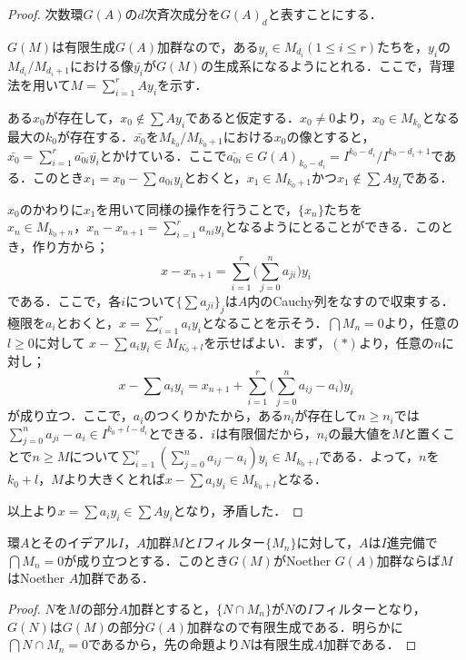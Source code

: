 \begin{proof}
	次数環$G(A)$の$d$次斉次成分を$G(A)_d$と表すことにする．
	
	$G(M)$は有限生成$G(A)$加群なので，ある$y_i\in M_{d_i} (1\leq i\leq r)$たちを，$y_i$の$M_{d_i}/M_{d_i+1}$における像$\bar{y_i}$が$G(M)$の生成系になるようにとれる．ここで，背理法を用いて$M=\sum_{i=1}^r Ay_i$を示す．
	
	ある$x_0$が存在して，$x_0\not\in\sum Ay_i$であると仮定する．$x_0\neq0$より，$x_0\in M_{k_0}$となる最大の$k_0$が存在する．$\bar{x_0}$を$M_{k_0}/M_{k_0+1}$における$x_0$の像とすると，$\bar{x_0}=\sum_{i=1}^r\bar{a_{0i}}\bar{y_i}$とかけている．ここで$\bar{a_{0i}}\in G(A)_{k_0-d_i}=I^{k_0-d_i}/I^{k_0-d_i+1}$である．このとき$x_1=x_0-\sum a_{0i}y_i$とおくと，$x_1\in M_{k_0+1}$かつ$x_1\not\in\sum Ay_i$である．
	
	$x_0$のかわりに$x_1$を用いて同様の操作を行うことで，$\{x_n\}$たちを$x_n\in M_{k_0+n}，x_n-x_{n+1}=\sum_{i=1}^r a_{ni}y_i$となるようにとることができる．このとき，作り方から；
	\[x-x_{n+1}=\sum_{i=1}^r\biggl(\sum_{j=0}^n a_{ji}\biggr) y_i\tag{$\ast$}\]
	である．ここで，各$i$について$\{\sum a_{ji}\}_j$は$A$内のCauchy列をなすので収束する．極限を$a_i$とおくと，$x=\sum_{i=1}^r a_iy_i$となることを示そう．$\bigcap M_n=0$より，任意の$l\geq0$に対して $x-\sum a_iy_i\in M_{K_0+l}$を示せばよい．まず，$(\ast)$より，任意の$n$に対し；
	\[x-\sum a_iy_i=x_{n+1}+\sum_{i=1}^r\biggl(\sum_{j=0}^{n} a_{ij}-a_i\biggr)y_i\]
	が成り立つ．ここで，$a_i$のつくりかたから，ある$n_i$が存在して$n\geq n_i$では$\sum_{j=0}^n a_{ji}-a_i\in I^{k_0+l-d_i}$とできる．$i$は有限個だから，$n_i$の最大値を$M$と置くことで$n\geq M$について$\sum_{i=1}^r(\sum_{j=0}^n a_{ij}-a_i)y_i\in M_{k_0+l}$である．よって，$n$を$k_0+l，M$より大きくとれば$x-\sum a_iy_i\in M_{k_0+l}$となる．
	
	以上より$x=\sum a_iy_i\in\sum Ay_i$となり，矛盾した．
\end{proof}

\begin{cor}\label{cor:G(M)がNoetherならMもNoether}
	環$A$とそのイデアル$I$，$A$加群$M$と$I$フィルター$\{M_n\}$に対して，$A$は$I$進完備で$\bigcap M_n=0$が成り立つとする．このとき$G(M)$がNoether $G(A)$加群ならば$M$はNoether $A$加群である．
\end{cor}

\begin{proof}
	$N$を$M$の部分$A$加群とすると，$\{N\cap M_n\}$が$N$の$I$フィルターとなり，$G(N)$は$G(M)$の部分$G(A)$加群なので有限生成である．明らかに$\bigcap N\cap M_n=0$であるから，先の命題より$N$は有限生成$A$加群である．
\end{proof}

